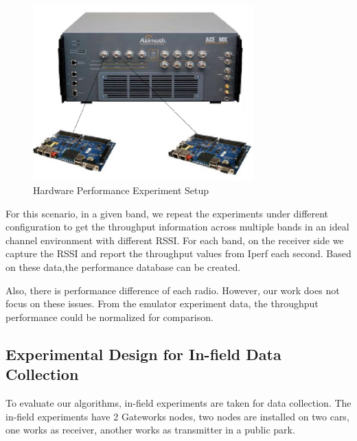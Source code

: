 \begin{figure}
\centering
\includegraphics[width=85mm]{figure/ideal_emulator}
\caption{Hardware Performance Experiment Setup}
\label{fig:in-door experiment}
\end{figure}

For this scenario, in a given band, we repeat the experiments under different configuration to get the throughput information across multiple bands in an ideal channel environment with different RSSI.
For each band, on the receiver side we capture the RSSI and report the throughput values from Iperf \cite{Iperf} each second. Based on these data,the performance database can be created.

Also, there is performance difference of each radio. However, our work does not focus on these issues. From the emulator experiment data, the throughput performance could be normalized for comparison. 


\subsection{Experimental Design for In-field Data Collection}

To evaluate our algorithms, in-field experiments are taken for data collection.
The in-field experiments have 2 Gateworks nodes, two nodes are installed on two cars, one works as receiver, another works as transmitter in a public park.

